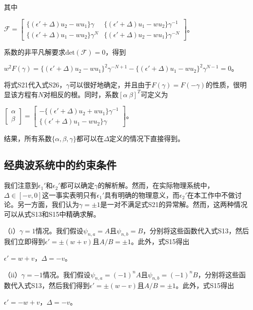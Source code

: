 其中

\(\mathcal{F}=\begin{bmatrix}\{(\epsilon'+\Delta)u_{2}-wu_{1}\}\gamma&\{(\epsilon'+\Delta)u_{1}-wu_{2}\}\gamma^{-1}\\\{(\epsilon'+\Delta)u_{1}-wu_{2}\}\gamma^{N}&\{(\epsilon'+\Delta)u_{2}-wu_{1}\}\gamma^{-N}\end{bmatrix}\)。

系数的非平凡解要求\(\mathrm{det}(\mathcal{F}) = 0\)，得到

\(w^{2}F(\gamma)=\{(\epsilon'+\Delta)u_{2}-wu_{1}\}^{2}\gamma^{-N + 1}-\{(\epsilon'+\Delta)u_{1}-wu_{2}\}^{2}\gamma^{N - 1}=0\)。

将式S21代入式S26，\(\gamma\)可以很好地确定，并且由于\(F(\gamma)=F(-\gamma)\)的性质，很明显该方程有\(N\)对相反的根。同时，系数\([\alpha\ \beta]^{T}\)可定义为

\(\begin{bmatrix}\alpha\\\beta\end{bmatrix}=\begin{bmatrix}-\{(\epsilon'+\Delta)u_{2}+wu_{1}\}\gamma^{-1}\\\{(\epsilon'+\Delta)u_{1}-wu_{2}\}\gamma\end{bmatrix}\)。

结果，所有系数\(\{\alpha,\beta,\gamma\}\)都可以在\(\Delta\)定义的情况下直接得到。

\subsection{经典波系统中的约束条件}

我们注意到\(\epsilon_{1}'\)和\(\epsilon_{2}'\)都可以确定\(\gamma\)的解析解。然而，在实际物理系统中，\(\Delta\in[-v,0]\)这一事实表明只有\(\epsilon_{1}'\)具有明确的物理意义，而\(\epsilon_{2}'\)在本工作中不做讨论。另一方面，我们认为\(\gamma=\pm1\)是一对不满足式S21的异常解。然而，这两种情况可以从式S13和S15中精确求解。

（i）\(\gamma = 1\)情况。我们假设\(\psi_{n,a}=A\)且\(\psi_{n,b}=B\)，分别将这些函数代入式S13，然后我们立即得到\(\epsilon'=\pm(w + v)\)且\(A/B=\pm1\)。此外，式S15得出

\(\epsilon' = w + v\)，\(\Delta = -v\)。

（ii）\(\gamma = -1\)情况。我们假设\(\psi_{n,a}=(-1)^{n}A\)且\(\psi_{n,b}=(-1)^{n}B\)，分别将这些函数代入式S13，然后我们得到\(\epsilon'=\pm(w - v)\)且\(A/B=\pm1\)。此外，式S15得出

\(\epsilon' = -w + v\)，\(\Delta = -v\)。

